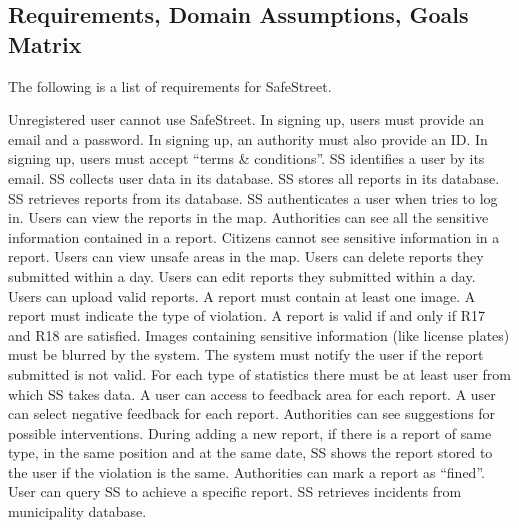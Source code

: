 \documentclass[../RASD.tex]{subfiles}
\begin{document}
            \subsection{Requirements, Domain Assumptions, Goals Matrix}\label{subsec:requirements,-domain-assumptions,-goals-matrix}
                The following is a list of requirements for SafeStreet.
                \begin{enumerate}
                     Unregistered user cannot use SafeStreet.
                     In signing up, users must provide an email and a password.
                     In signing up, an authority must also provide an ID.
                     In signing up, users must accept “terms \& conditions”.
                     SS identifies a user by its email.
                     SS collects user data in its database.
                     SS stores all reports in its database.
                     SS retrieves reports from its database.
                     SS authenticates a user when tries to log in.
                     Users can view the reports in the map.
                     Authorities can see all the sensitive information contained in a report.
                     Citizens cannot see sensitive information in a report.
                     Users can view unsafe areas in the map.
                     Users can delete reports they submitted within a day.
                     Users can edit reports they submitted within a day.
                     Users can upload valid reports.
                     A report must contain at least one image.
                     A report must indicate the type of violation.
                     A report is valid if and only if R17 and R18 are satisfied.
                     Images containing sensitive information (like license plates) must be blurred by the system.
                     The system must notify the user if the report submitted is not valid.
                     For each type of statistics there must be at least user from which SS takes data.
                     A user can access to feedback area for each report.
                     A user can select negative feedback for each report.
                     Authorities can see suggestions for possible interventions.
                     During adding a new report, if there is a report of same type, in the same position and at the same date, SS shows the report stored to the user if the violation is the same.
                     Authorities can mark a report as “fined”.
                     User can query SS to achieve a specific report.
                     SS retrieves incidents from municipality database.
                \end{enumerate}
\end{document}
